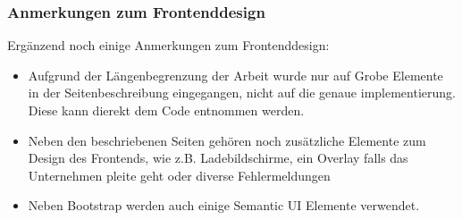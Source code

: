 \subsubsection{Anmerkungen zum Frontenddesign}
Ergänzend noch einige Anmerkungen zum Frontenddesign:

\begin{itemize}
\item Aufgrund der Längenbegrenzung der Arbeit wurde nur auf Grobe Elemente in der Seitenbeschreibung eingegangen, nicht auf die genaue implementierung. Diese kann dierekt dem Code entnommen werden.
\item Neben den beschriebenen Seiten gehören noch zusätzliche Elemente zum Design des Frontends, wie z.B. Ladebildschirme, ein Overlay falls das Unternehmen pleite geht oder diverse Fehlermeldungen
\item Neben Bootstrap werden auch einige Semantic UI Elemente verwendet.
\end{itemize}
